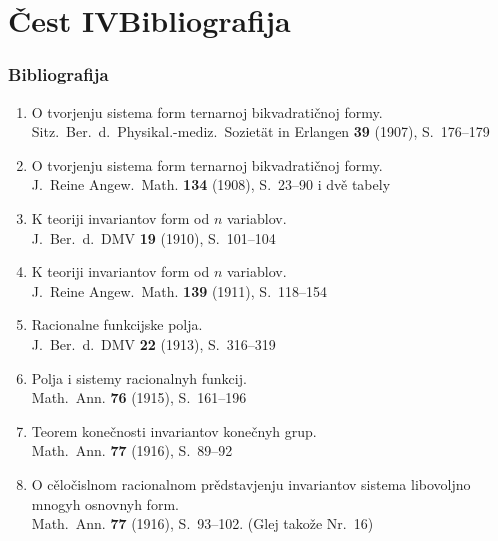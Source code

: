\documentclass[11pt]{article}
\newcommand{\foreign}[1]{#1}
\begin{document}
\part*{Čest IV\hspace{1em}Bibliografija}

\section*{Bibliografija}

\begin{enumerate}[label={\small\arabic*.},leftmargin=2em,itemsep=0.3em]
\item O tvorjenju sistema form ternarnoj bikvadratičnoj formy.\\
\foreign{Sitz.\ Ber.\ d.\ Physikal.-mediz.\ Sozietät in Erlangen} \textbf{39} (1907), S.~176--179

\item O tvorjenju sistema form ternarnoj bikvadratičnoj formy.\\
\foreign{J.\ Reine Angew.\ Math.} \textbf{134} (1908), S.~23--90 i dvě tabely

\item K teoriji invariantov form od $n$ variablov.\\
\foreign{J.\ Ber.\ d.\ DMV} \textbf{19} (1910), S.~101--104

\item K teoriji invariantov form od $n$ variablov.\\
\foreign{J.\ Reine Angew.\ Math.} \textbf{139} (1911), S.~118--154

\item Racionalne funkcijske polja.\\
\foreign{J.\ Ber.\ d.\ DMV} \textbf{22} (1913), S.~316--319

\item Polja i sistemy racionalnyh funkcij.\\
\foreign{Math.\ Ann.} \textbf{76} (1915), S.~161--196

\item Teorem konečnosti invariantov konečnyh grup.\\
\foreign{Math.\ Ann.} \textbf{77} (1916), S.~89--92

\item O cěločislnom racionalnom prědstavjenju invariantov sistema libovoljno mnogyh osnovnyh form.\\
\foreign{Math.\ Ann.} \textbf{77} (1916), S.~93--102. (Glej takože Nr.~16)


\end{enumerate}
\end{document}

